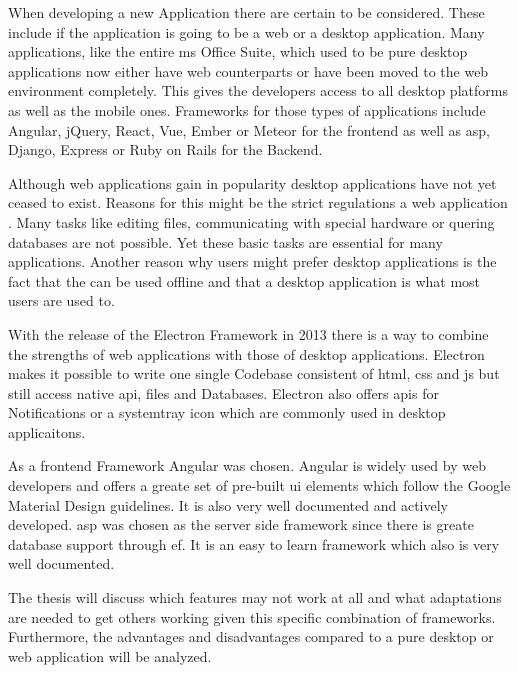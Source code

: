 
When developing a new Application there are certain  to be considered. These include if the application is going to be a web or a desktop application. Many applications, like the entire \gls{ms} Office Suite, which used to be pure desktop applications now either have web counterparts or have been moved to the web environment completely. This gives the developers access to all desktop platforms as well as the mobile ones. Frameworks for those types of applications include Angular, jQuery, React, Vue, Ember or Meteor for the frontend as well as \gls{asp}, Django, Express or Ruby on Rails for the Backend.

Although web applications gain in popularity desktop applications have not yet ceased to exist. Reasons for this might be the strict regulations a web application . Many tasks like editing files, communicating with special hardware or quering databases are not possible. Yet these basic tasks are essential for many applications. Another reason why users might prefer desktop applications is the fact that the can be used offline and that a desktop application is what most users are used to.

With the release of the Electron Framework in 2013 there is a way to combine the strengths of web applications with those of desktop applications. Electron makes it possible to write one single Codebase consistent of \gls{html}, \gls{css} and \gls{js} but still access native \gls{api}, files and Databases. Electron also offers \gls{api}s for Notifications or a systemtray icon which are commonly used in desktop applicaitons.

As a frontend Framework Angular was chosen. Angular is widely used by web developers and offers a greate set of pre-built \gls{ui} elements which follow the Google Material Design guidelines. It is also very well documented and actively developed. \gls{asp} was chosen as the server side framework since there is greate database support through \gls{ef}. It is an easy to learn framework which also is very well documented.

The thesis will discuss which features may not work at all and what adaptations are needed to get others working given this specific combination of frameworks. Furthermore, the advantages and disadvantages compared to a pure desktop or web application will be analyzed.



